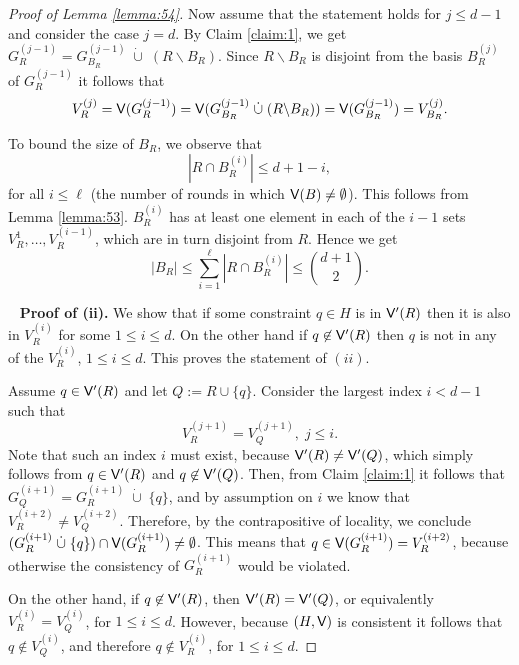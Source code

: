 \documentclass[12pt]{article}
\def\Violators{{\sf V}}
\theoremstyle{remark}
\begin{document}
\begin{proof}[Proof of Lemma \ref{lemma:54}]
    Now assume that the statement holds for $j\leq d-1$ and consider the case $j=d$. By Claim 
    \ref{claim:1}, we get $G_{R}^{(j-1)} = G_{B_{R}}^{(j-1)} \;\dot{\cup}\; (R\backslash B_{R})$.
    Since $R\backslash B_{R}$ is disjoint from the basis $B_{R}^{(j)}$ of $G_{R}^{(j-1)}$ it follows that
    \[
    	V_{R}^{(j)} = \Violators(G_{R}^{(j-1)}) = \Violators(G_{B_{R}}^{(j-1)} \;\dot{\cup}\; (R\backslash 
	B_{R})) =	\Violators(G_{B_{R}}^{(j-1)}) = V_{B_{R}}^{(j)}.
    \]
    
    To bound the size of $B_{R}$, we observe that
    \[
    	|R\cap B_{R}^{(i)}| \leq d+1-i,
    \]
    for all $i\leq \ell$ (the number of rounds in which $\Violators(B)\neq\emptyset$). This follows
    from Lemma \ref{lemma:53}. $B_{R}^{(i)}$ has at least one element in each of the $i-1$ sets
    $V_{R}^{1},\ldots, V_{R}^{(i-1)}$, which are in turn disjoint from $R$. Hence we get
    \[
    	|B_{R}| \leq \sum_{i=1}^{\ell} |R\cap B_{R}^{(i)}| \leq {d+1 \choose 2}.
    \]
    
    ~\newline
     \textbf{Proof of (ii).}
     We show that if some constraint $q\in H$ is in $\Violators'(R)$ then it is also in $V_R^{(i)}$ for
     some $1\leq i \leq d$. On the other hand if $q\not\in \Violators'(R)$ then $q$ is not in
     any of the $V_{R}^{(i)}$, $1\leq i \leq d$. This proves the statement of $(ii)$.
     
     Assume $q\in\Violators'(R)$ and let $Q:=R\cup \{q\}$. Consider the largest index
     $i< d-1$ such that
     \[
     	V_{R}^{(j+1)} = V_{Q}^{(j+1)},\; j\leq i.
     \]
     Note that such an index $i$ must exist, because $\Violators'(R) \neq \Violators'(Q)$, which
     simply follows from $q\in \Violators'(R)$ and $q\not\in\Violators'(Q)$.
     Then, from Claim \ref{claim:1} it follows that $G_{Q}^{(i+1)}= G_{R}^{(i+1)} \;\dot{\cup}\; \{q\}$, and
     by assumption on $i$ we know that $V_{R}^{(i+2)} \neq V_{Q}^{(i+2)}$. Therefore, by the contrapositive of locality,
     we conclude $(G_{R}^{(i+1)} \;\dot{\cup}\; \{q\}) \cap \Violators(G_{R}^{{(i+1)}})\neq \emptyset$.
     This means that $q\in \Violators(G_{R}^{{(i+1)}})= V_{R}^{(i+2)}$, because otherwise the 
consistency of $G_{R}^{(i+1)}$
     would be violated.
     
     On the other hand, if $q\not\in \Violators'(R)$, then $\Violators'(R) = \Violators'(Q)$, or equivalently
     $V_{R}^{(i)} = V_{Q}^{(i)}$, for $1\leq i \leq d$.
    However, because $(H, \Violators)$ is consistent it follows that $q\not\in V_{Q}^{(i)}$, and
    therefore $q\not\in V_{R}^{(i)}$,  for $1\leq i\leq d$.
    

\end{proof}
\end{document}
